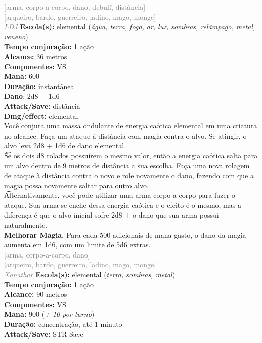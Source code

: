 \documentclass{RPG_Adventure}[2021/10/20]
\begin{document}
{\scriptsize \textcolor{gray}{[arma, corpo-a-corpo, dano, debuff, distância]\\}}
{\scriptsize \textcolor{gray}{[arqueiro, bardo, guerreiro, ladino, mago, monge]\\}}
{\tiny \textcolor{gray}{\textit{LDJ}}}\jump{}
{\small \t \textbf{Escola(s):} elemental (\textit{água, terra, fogo, ar, luz, sombras, relâmpago, metal, veneno})\\\t \textbf{Tempo conjuração:} 1 ação\\\t \textbf{Alcance:} 36 metros\\\t \textbf{Componentes:} VS\\\t \textbf{Mana:} 600\\\t \textbf{Duração:} instantânea\\\t \textbf{Dano}: 2d8 + 1d6\\\t \textbf{Attack/Save:} distância\\\t \textbf{Dmg/effect:} elemental\\}
{\normalsize Você conjura uma massa ondulante de energia caótica elemental em uma criatura no alcance. Faça um ataque à distância com magia contra o alvo. Se atingir, o alvo leva 2d8 + 1d6 de dano elemental.\\\t Se os dois d8 rolados possuírem o mesmo valor, então a energia caótica salta para um alvo dentro de 9 metros de distância a sua escolha. Faça uma nova rolagem de ataque à distância contra o novo e role novamente o dano, fazendo com que a magia possa novamente saltar para outro alvo.\\\t Alternativamente, você pode utilizar uma arma corpo-a-corpo para fazer o ataque. Sua arma se enche dessa energia caótica e o efeito é o mesmo, mas a diferença é que o alvo inicial sofre 2d8 + o dano que sua arma possui naturalmente.\\\t \textbf{Melhorar Magia.} Para cada 500 adicionais de mana gasto, o dano da magia aumenta em 1d6, com um limite de 5d6 extras.\\}
{\scriptsize \textcolor{gray}{[arma, corpo-a-corpo, dano]\\}}
{\scriptsize \textcolor{gray}{[arqueiro, bardo, guerreiro, ladino, mago, monge]\\}}
{\tiny \textcolor{gray}{\textit{Xanathar}}}\jump{}
{\small \t \textbf{Escola(s):} elemental (\textit{terra, sombras, metal})\\\t \textbf{Tempo conjuração:} 1 ação\\\t \textbf{Alcance:} 90 metros\\\t \textbf{Componentes:} VS\\\t \textbf{Mana:} 900 (\textit{+ 10 por turno})\\\t \textbf{Duração:} concentração, até 1 minuto\\\t \textbf{Attack/Save:} STR Save\\}
\end{document}
